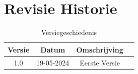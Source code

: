 \documentclass{article}
\begin{document}
  \tableofcontents
  \pagebreak 

  \section{Revisie Historie}
  \begin{table}[h]
      \centering
      \begin{tabular}{|c|c|c|p{5cm}|}
          \hline
          \textbf{Versie} & \textbf{Datum} & \textbf{Omschrijving}  \\
          \hline
          1.0  & 19-05-2024 & Eerste Versie \\
          \hline
  
      \end{tabular}
      \caption{Versiegeschiedenis}
  \end{table}
  \pagebreak
\end{document}
